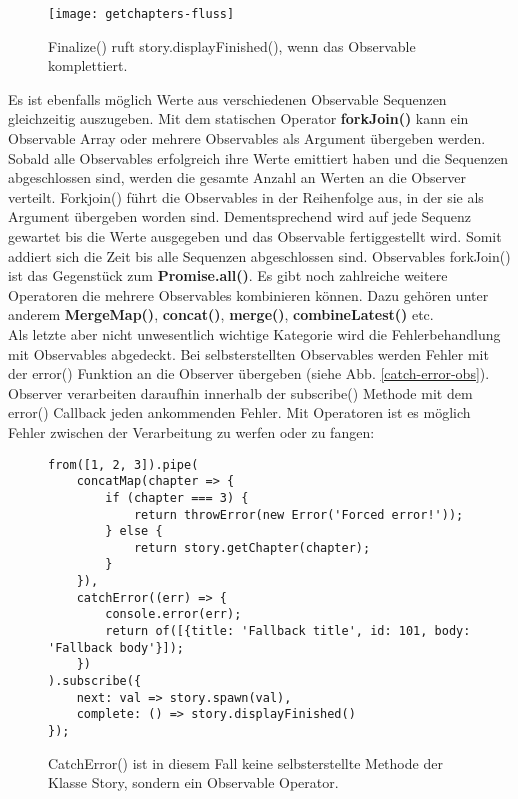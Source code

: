 \begin{figure}[H]
\centering
\texttt{[image: getchapters-fluss]}
\caption{Finalize() ruft story.displayFinished(), wenn das Observable komplettiert.}
\end{figure}


\noindent
Es ist ebenfalls möglich Werte aus verschiedenen Observable Sequenzen gleichzeitig auszugeben. Mit dem statischen Operator \textbf{forkJoin()} kann ein Observable Array oder mehrere Observables als Argument übergeben werden. Sobald alle Observables erfolgreich ihre Werte emittiert haben und die Sequenzen abgeschlossen sind, werden die gesamte Anzahl an Werten an die Observer verteilt. Forkjoin() führt die Observables in der Reihenfolge aus, in der sie als Argument übergeben worden sind. Dementsprechend wird auf jede Sequenz gewartet bis die Werte ausgegeben und das Observable fertiggestellt wird. Somit addiert sich die Zeit bis alle Sequenzen abgeschlossen sind. Observables forkJoin() ist das Gegenstück zum \textbf{Promise.all()}. Es gibt noch zahlreiche weitere Operatoren die mehrere Observables kombinieren können. Dazu gehören unter anderem \textbf{MergeMap()}, \textbf{concat()}, \textbf{merge()}, \textbf{combineLatest()} etc.\\


\noindent
Als letzte aber nicht unwesentlich wichtige Kategorie wird die Fehlerbehandlung mit Observables abgedeckt. Bei selbsterstellten Observables werden Fehler mit der error() Funktion an die Observer übergeben (siehe Abb. \ref{catch-error-obs}). Observer verarbeiten daraufhin innerhalb der subscribe() Methode mit dem error() Callback jeden ankommenden Fehler. Mit Operatoren ist es möglich Fehler zwischen der Verarbeitung zu werfen oder zu fangen:

\begin{figure}[H]
\begin{lstlisting}[basicstyle=\small]
from([1, 2, 3]).pipe(
    concatMap(chapter => {
        if (chapter === 3) {
            return throwError(new Error('Forced error!'));
        } else {
            return story.getChapter(chapter);
        }
    }),
    catchError((err) => {
        console.error(err);
        return of([{title: 'Fallback title', id: 101, body: 'Fallback body'}]);
    })
).subscribe({
    next: val => story.spawn(val),
    complete: () => story.displayFinished()
});
\end{lstlisting}
\caption{CatchError() ist in diesem Fall keine selbsterstellte Methode der Klasse Story, sondern ein Observable Operator.}
\end{figure}

